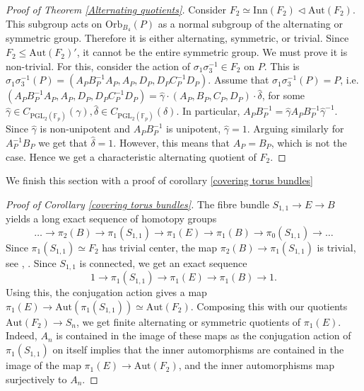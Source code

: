 \documentclass[letterpaper]{amsart}
\begin{document}
\begin{proof}[Proof of Theorem \ref{Alternating quotients}]
    Consider $F_2 \simeq \mathrm{Inn}(F_2) \lhd \mathrm{Aut}(F_2)$. This subgroup acts on $\mathrm{Orb}_{B_4}(P)$ as a normal subgroup of the alternating or symmetric group. Therefore it is either alternating, symmetric, or trivial. Since $F_2 \leq \mathrm{Aut}(F_2)'$, it cannot be the entire symmetric group. We must prove it is non-trivial. For this, consider the action of $\sigma_1\sigma_3^{-1} \in F_2$ on $P$. This is $\sigma_1\sigma_3^{-1}(P) = (A_PB_P^{-1}A_P, A_P, D_P, D_PC_P^{-1}D_P)$. Assume that $\sigma_1\sigma_3^{-1}(P) = P$, i.e. $(A_PB_P^{-1}A_P, A_P, D_P, D_PC_P^{-1}D_P) = \hat{\gamma} \cdot (A_P, B_P, C_P, D_P) \cdot \hat{\delta}$, for some $\hat{\gamma} \in C_{\mathrm{PGL}_2(\mathbb{F}_p)}(\gamma), \hat{\delta} \in C_{\mathrm{PGL}_2(\mathbb{F}_p)}(\delta)$. In particular, $A_PB_P^{-1} = \hat{\gamma} A_PB_P^{-1} \hat{\gamma}^{-1}$. Since $\hat{\gamma}$ is non-unipotent and $A_PB_P^{-1}$ is unipotent, $\hat{\gamma} = 1$. Arguing similarly for $A_P^{-1}B_P$ we get that $\hat{\delta} = 1$. However, this means that $A_P = B_P$, which is not the case. Hence we get a characteristic alternating quotient of $F_2$.
\end{proof}
We finish this section with a proof of corollary \ref{covering torus bundles}
\begin{proof}[Proof of Corollary \ref{covering torus bundles}]
The fibre bundle $S_{1,1} \to E \to B$ yields a long exact sequence of homotopy groups $$\dots \to \pi_2(B) \to \pi_1(S_{1,1}) \to \pi_1(E) \to \pi_1(B) \to \pi_0(S_{1,1}) \to \dots$$Since $\pi_1(S_{1,1}) \simeq F_2$ has trivial center, the map $\pi_2(B) \to \pi_1(S_{1,1})$ is trivial, see \cite[Section 2.6]{brown2011nonabelian}, \cite[Chapter IV.3]{whitehead2012elements}. Since $S_{1,1}$ is connected, we get an exact sequence $$1 \to \pi_1(S_{1,1}) \to \pi_1(E) \to \pi_1(B) \to 1.$$Using this, the conjugation action gives a map $\pi_1(E) \to \mathrm{Aut}(\pi_1(S_{1,1})) \simeq \mathrm{Aut}(F_2)$. Composing this with our quotients $\mathrm{Aut}(F_2) \to S_n$, we get finite alternating or symmetric quotients of $\pi_1(E)$. Indeed, $A_n$ is contained in the image of these maps as the conjugation action of $\pi_1(S_{1,1})$ on itself implies that the inner automorphisms are contained in the image of the map $\pi_1(E) \to \mathrm{Aut}(F_2)$, and the inner automorphisms map surjectively to $A_n$.
\end{proof}
\end{document}
